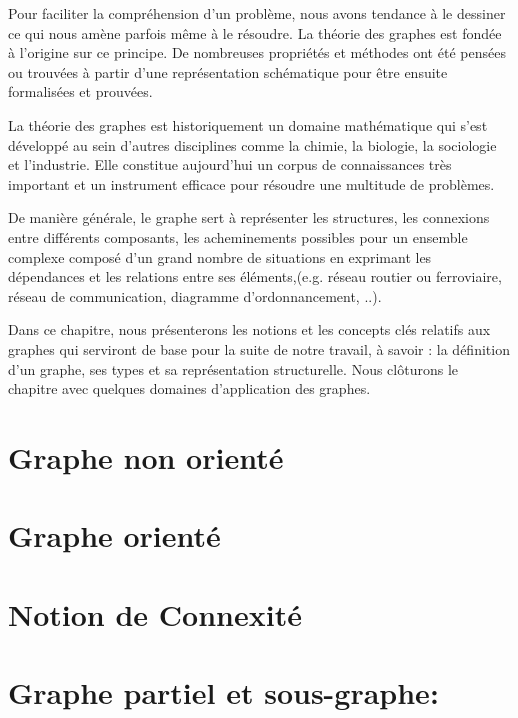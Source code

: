 Pour faciliter la compréhension d'un problème, nous avons tendance à le dessiner ce qui nous amène parfois même à le résoudre. La théorie des graphes est fondée à l'origine sur ce principe. De nombreuses propriétés et méthodes ont été pensées ou trouvées à partir d'une représentation schématique pour être ensuite formalisées et prouvées.


La théorie des graphes est historiquement un domaine mathématique qui s'est développé  au sein d'autres disciplines comme la chimie, la biologie, la sociologie et l'industrie. Elle constitue aujourd'hui un corpus de connaissances très important et un instrument efficace pour résoudre une multitude de problèmes.


De manière générale, le graphe sert à représenter les structures, les connexions entre différents composants, les acheminements possibles pour un ensemble complexe composé d'un grand nombre de situations en exprimant les dépendances et les relations entre ses éléments,(e.g. réseau routier ou ferroviaire, réseau de communication, diagramme d'ordonnancement, ..). 


Dans ce chapitre, nous présenterons les notions et les concepts clés relatifs aux graphes qui serviront de base pour la suite de notre travail, à savoir : la définition d'un graphe, ses types et sa représentation structurelle. Nous clôturons le chapitre avec quelques domaines d'application des graphes.

	
	\section{Graphe non orienté}
		
			
	\section{Graphe orienté}	
		
		
	\section{Notion de Connexité}
	
	
	
	
	
	\section{Graphe partiel et sous-graphe:}
    				
	
